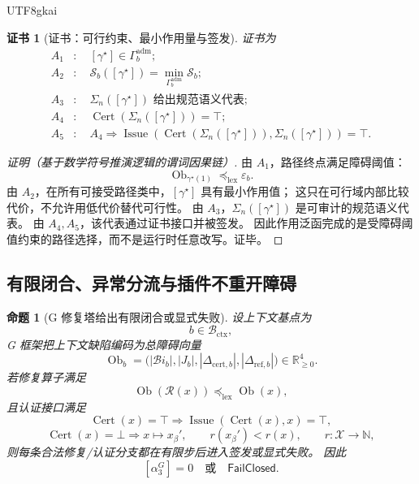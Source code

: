 \documentclass[12pt]{article}
\newtheorem{proposition}{命题}[section]
\newtheorem{Certificate}{证书}[section]
\newcommand{\NN}{\mathbb{N}}
\newcommand{\RR}{\mathbb{R}}
\newcommand{\FailClosed}{\mathsf{FailClosed}}
\newcommand{\Cert}{\operatorname{Cert}}
\newcommand{\Issue}{\operatorname{Issue}}
\begin{document}
\begin{CJK*}{UTF8}{gkai}
\begin{Certificate}[证书：可行约束、最小作用量与签发]
\label{cert:tex51-g-action-selects-path}
证书为
\[
\begin{aligned}
  A_1&:\quad [\gamma^\star]\in\Gamma_b^{\mathrm{adm}};\\
  A_2&:\quad \mathcal S_b([\gamma^\star])
  =
  \min_{\Gamma_b^{\mathrm{adm}}}\mathcal S_b;\\
  A_3&:\quad \Sigma_n([\gamma^\star])\text{ 给出规范语义代表};\\
  A_4&:\quad \Cert(\Sigma_n([\gamma^\star]))=\top;\\
  A_5&:\quad A_4\Rightarrow
  \Issue(\Cert(\Sigma_n([\gamma^\star])),\Sigma_n([\gamma^\star]))=\top.
\end{aligned}
\]
\end{Certificate}

\begin{proof}[证明（基于数学符号推演逻辑的谓词因果链）]
由 \(A_1\)，路径终点满足障碍阈值：
\[
  \operatorname{Ob}_{\gamma^\star(1)}
  \preceq_{\mathrm{lex}}
  \varepsilon_b.
\]
由 \(A_2\)，在所有可接受路径类中，\([\gamma^\star]\) 具有最小作用值；
这只在可行域内部比较代价，不允许用低代价替代可行性。
由 \(A_3\)，\(\Sigma_n([\gamma^\star])\) 是可审计的规范语义代表。
由 \(A_4,A_5\)，该代表通过证书接口并被签发。
因此作用泛函完成的是受障碍阈值约束的路径选择，而不是运行时任意改写。证毕。
\end{proof}

\subsection{有限闭合、异常分流与插件不重开障碍}
\label{subsec:tex51-g-failclosed}

\begin{proposition}[G 修复塔给出有限闭合或显式失败]
\label{prop:tex51-g-finite-closure}
设上下文基点为
\[
  b\in\mathcal B_{\mathrm{ctx}},
\]
G 框架把上下文缺陷编码为总障碍向量
\[
  \operatorname{Ob}_b
  =
  \bigl(
    |\mathcal B\!i_b|,
    |J_b|,
    |\Delta_{\mathrm{cert},b}|,
    |\Delta_{\mathrm{ref},b}|
  \bigr)
  \in\RR_{\ge0}^{4}.
\]
若修复算子满足
\[
  \operatorname{Ob}(\mathcal R(x))
  \preceq_{\mathrm{lex}}
  \operatorname{Ob}(x),
\]
且认证接口满足
\[
  \Cert(x)=\top\Rightarrow\Issue(\Cert(x),x)=\top,
\]
\[
  \Cert(x)=\bot\Rightarrow
  x\mapsto x_\beta',
  \qquad
  r(x_\beta')<r(x),
  \qquad
  r:\mathcal X\to\NN,
\]
则每条合法修复/认证分支都在有限步后进入签发或显式失败。
因此
\[
  [\alpha_3^G]=0
  \quad\text{或}\quad
  \FailClosed.
\]
\end{proposition}


\end{CJK*}
\end{document}
